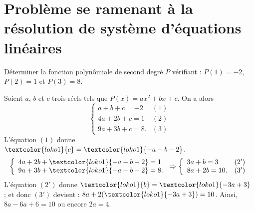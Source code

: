             \section{Probl\`eme se ramenant \`a la r\'esolution de syst\`eme d'\'equations lin\'eaires}
                  \begin{ex}
                        D\'eterminer la fonction polyn\^omiale de second degr\'e $P$ v\'erifiant :
                        $P(1) = -2$, $P(2) = 1$ et $P(3) = 8$.
                        \begin{valiny}
                              Soient $a$, $b$ et $c$ trois r\'eels tels que $P(x) = a x^2 + b x + c$.
                              On a alors 
                              \[
                                    \left\lbrace
                                          \begin{array}{lc}
                                                  a +   b + c = -2    & (1)       \\
                                                4 a + 2 b + c =  1    & (2)       \\
                                                9 a + 3 b + c =  8.   & (3)       
                                          \end{array}
                                    \right.
                              \]
                              L'\'equation $(1)$ donne $\textcolor{loko1}{c} = \textcolor{loko1}{-a -b - 2}$.
                              \[
                                    \left\lbrace
                                          \begin{array}{l}
                                                4 a + 2 b + \textcolor{loko1}{-a -b - 2} =  1   \\
                                                9 a + 3 b + \textcolor{loko1}{-a -b - 2} =  8.        
                                          \end{array}
                                    \right.
                                    \Rightarrow
                                    \left\lbrace
                                          \begin{array}{lc}
                                                3 a +   b =  3    & (2')       \\
                                                8 a + 2 b = 10.   & (3')       
                                          \end{array}
                                    \right.
                              \]
                              L'\'equation $(2')$ donne $\textcolor{loko1}{b} = \textcolor{loko1}{-3a +3}$ ;
                              et donc $(3')$ devient : $ 8 a + 2 (\textcolor{loko1}{-3a +3}) = 10 $.
                              Ainsi, $ 8a - 6a + 6 = 10 $ ou encore $ 2a = 4 $.
                              

\end{valiny}
\end{ex}

